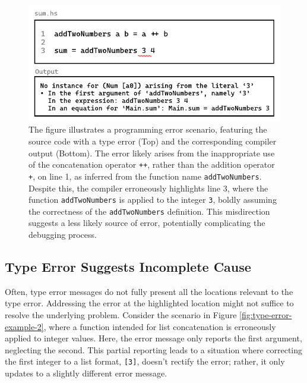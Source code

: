  \begin{figure}[hbt]
  \includegraphics[width=\linewidth]{TypeErrorExample}
  \caption{
    \label{fig:type-error-example}
    The figure illustrates a programming error scenario, featuring the source code with a type error (Top) and the corresponding compiler output (Bottom). The error likely arises from the inappropriate use of the concatenation operator \texttt{++}, rather than the addition operator \texttt{+}, on line 1, as inferred from the function name \texttt{addTwoNumbers}. Despite this, the compiler erroneously highlights line 3, where the function \texttt{addTwoNumbers} is applied to the integer \texttt{3}, boldly assuming the correctness of the \texttt{addTwoNumbers} definition. This misdirection suggests a less likely source of error, potentially complicating the debugging process.
    }
\end{figure}


\subsection{Type Error Suggests Incomplete Cause}
\label{subsec:imcomplete}

Often, type error messages do not fully present all the locations relevant to the type error. Addressing the error at the highlighted location might not suffice to resolve the underlying problem. Consider the scenario in Figure \ref{fig:type-error-example-2}, where a function intended for list concatenation is erroneously applied to integer values. Here, the error message only reports the first argument, neglecting the second. This partial reporting leads to a situation where correcting the first integer to a list format, \texttt{[3]}, doesn't rectify the error; rather, it only updates to a slightly different error message. 



